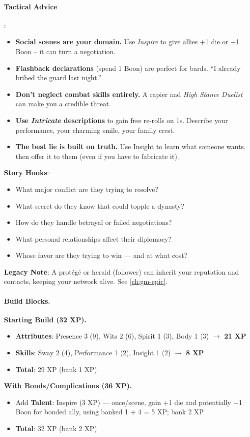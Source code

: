 \paragraph{Tactical Advice}:
\begin{itemize}
\item \textbf{Social scenes are your domain.} Use \emph{Inspire} to give allies +1 die or +1 Boon -- it can turn a negotiation.
\item \textbf{Flashback declarations} (spend 1 Boon) are perfect for bards. ``I already bribed the guard last night.''
\item \textbf{Don't neglect combat skills entirely.} A rapier and \emph{High Stance Duelist} can make you a credible threat.
\item \textbf{Use \emph{Intricate} descriptions} to gain free re-rolls on 1s. Describe your performance, your charming smile, your family crest.
\item \textbf{The best lie is built on truth.} Use Insight to learn what someone wants, then offer it to them (even if you have to fabricate it).
\end{itemize}

\textbf{Story Hooks}:
\begin{itemize}
\item What major conflict are they trying to resolve?
\item What secret do they know that could topple a dynasty?
\item How do they handle betrayal or failed negotiations?
\item What personal relationships affect their diplomacy?
\item Whose favor are they trying to win --- and at what cost?
\end{itemize}

\textbf{Legacy Note}: A protégé or herald (follower) can inherit your reputation and contacts, keeping your network alive. See \ref{ch:gm-epic}.

\paragraph{Build Blocks.}
\textbf{Starting Build (32 XP).}
\begin{itemize}
\item \textbf{Attributes}: Presence 3 (9), Wits 2 (6), Spirit 1 (3), Body 1 (3) \(\rightarrow\) \textbf{21 XP}
\item \textbf{Skills}: Sway 2 (4), Performance 1 (2), Insight 1 (2) \(\rightarrow\) \textbf{8 XP}
\item \textbf{Total}: 29 XP (bank 1 XP)
\end{itemize}
\textbf{With Bonds/Complications (36 XP).}
\begin{itemize}
\item Add \textbf{Talent}: Inspire (3 XP) --- once/scene, gain +1 die and potentially +1 Boon for bonded ally, using banked 1 + 4 = 5 XP; bank 2 XP
\item \textbf{Total}: 32 XP (bank 2 XP)
\end{itemize}

